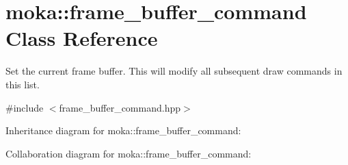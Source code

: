 \hypertarget{classmoka_1_1frame__buffer__command}{}\section{moka\+::frame\+\_\+buffer\+\_\+command Class Reference}
\label{classmoka_1_1frame__buffer__command}


Set the current frame buffer. This will modify all subsequent draw commands in this list.  




{\ttfamily \#include $<$frame\+\_\+buffer\+\_\+command.\+hpp$>$}



Inheritance diagram for moka\+::frame\+\_\+buffer\+\_\+command\+:


Collaboration diagram for moka\+::frame\+\_\+buffer\+\_\+command\+:
